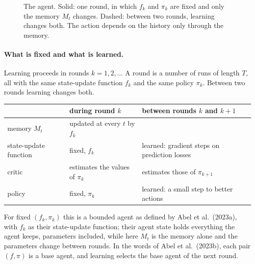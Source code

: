 \documentclass[11pt]{article}
\theoremstyle{definition}
\begin{document}
\begin{figure}[h]
\centering
{}
\caption{The agent. Solid: one round, in which $f_k$ and $\pi_k$ are fixed and only the memory $M_t$ changes. Dashed: between two rounds, learning changes both. The action depends on the history only through the memory.}\label{fig:agent}
\end{figure}

\paragraph{What is fixed and what is learned.} Learning proceeds in rounds $k=1,2,\dots$ A round is a number of runs of length $T$, all with the same state-update function $f_k$ and the same policy $\pi_k$. Between two rounds learning changes both.
\begin{center}
\small
\begin{tabular}{lll}
\hline
 & during round $k$ & between rounds $k$ and $k+1$\\
\hline
memory $M_t$ & updated at every $t$ by $f_k$ & \\
state-update function & fixed, $f_k$ & learned: gradient steps on prediction losses\\
critic & estimates the values of $\pi_k$ & estimates those of $\pi_{k+1}$\\
policy & fixed, $\pi_k$ & learned: a small step to better actions\\
\hline
\end{tabular}
\end{center}
For fixed $(f_k,\pi_k)$ this is a bounded agent as defined by Abel et al.\ (2023a), with $f_k$ as their state-update function; their agent state holds everything the agent keeps, parameters included, while here $M_t$ is the memory alone and the parameters change between rounds. In the words of Abel et al.\ (2023b), each pair $(f,\pi)$ is a base agent, and learning selects the base agent of the next round.
\end{document}
